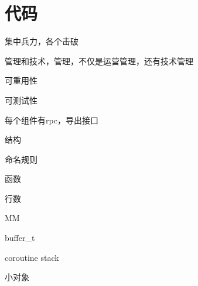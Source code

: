 \chapter{代码}

集中兵力，各个击破

管理和技术，管理，不仅是运营管理，还有技术管理

可重用性

可测试性

\begin{enumbox}
\item 每个组件有rpc，导出接口
\end{enumbox}

结构
\begin{enumbox}
\item 命名规则
\end{enumbox}

函数
\begin{enumbox}
\item 行数
\end{enumbox}

MM
\begin{enumbox}
\item buffer\_t
\item coroutine stack
\item 小对象
\end{enumbox}
